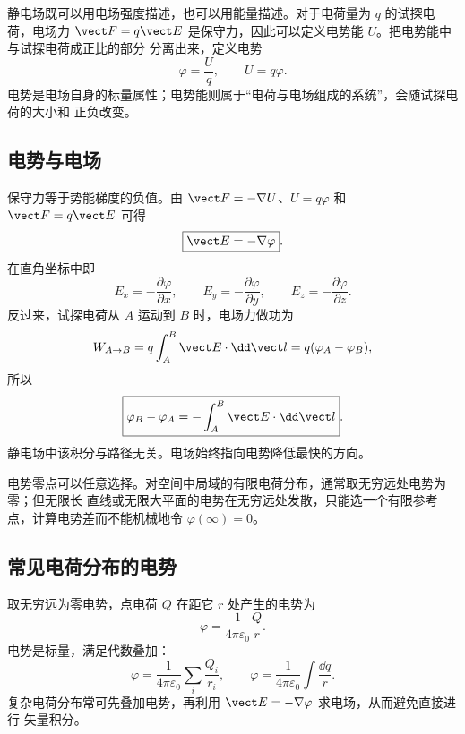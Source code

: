 静电场既可以用电场强度描述，也可以用能量描述。对于电荷量为 $q$ 的试探电荷，电场力
$\vect F=q\vect E$ 是保守力，因此可以定义电势能 $U$。把电势能中与试探电荷成正比的部分
分离出来，定义电势
\begin{equation}
  \boxed{\varphi=\frac{U}{q}},
  \qquad U=q\varphi.
\end{equation}
电势是电场自身的标量属性；电势能则属于“电荷与电场组成的系统”，会随试探电荷的大小和
正负改变。

\subsection*{电势与电场}

保守力等于势能梯度的负值。由 $\vect F=-\nabla U$、$U=q\varphi$ 和
$\vect F=q\vect E$ 可得
\begin{equation}
  \boxed{\vect E=-\nabla\varphi}.
\end{equation}
在直角坐标中即
\begin{equation}
  E_x=-\frac{\partial\varphi}{\partial x},
  \qquad
  E_y=-\frac{\partial\varphi}{\partial y},
  \qquad
  E_z=-\frac{\partial\varphi}{\partial z}.
\end{equation}
反过来，试探电荷从 $A$ 运动到 $B$ 时，电场力做功为
\begin{equation}
  W_{A\to B}=q\int_A^B\vect E\cdot\dd\vect l
  =q(\varphi_A-\varphi_B),
\end{equation}
所以
\begin{equation}
  \boxed{\varphi_B-\varphi_A
  =-\int_A^B\vect E\cdot\dd\vect l}.
\end{equation}
静电场中该积分与路径无关。电场始终指向电势降低最快的方向。

\potentialGradientDiagram

电势零点可以任意选择。对空间中局域的有限电荷分布，通常取无穷远处电势为零；但无限长
直线或无限大平面的电势在无穷远处发散，只能选一个有限参考点，计算电势差而不能机械地令
$\varphi(\infty)=0$。

\subsection*{常见电荷分布的电势}

取无穷远为零电势，点电荷 $Q$ 在距它 $r$ 处产生的电势为
\begin{equation}
  \boxed{\varphi=\frac{1}{4\pi\varepsilon_0}\frac{Q}{r}}.
\end{equation}
电势是标量，满足代数叠加：
\begin{equation}
  \varphi=\frac{1}{4\pi\varepsilon_0}\sum_i\frac{Q_i}{r_i},
  \qquad
  \varphi=\frac{1}{4\pi\varepsilon_0}\int\frac{\dd q}{r}.
\end{equation}
复杂电荷分布常可先叠加电势，再利用 $\vect E=-\nabla\varphi$ 求电场，从而避免直接进行
矢量积分。

